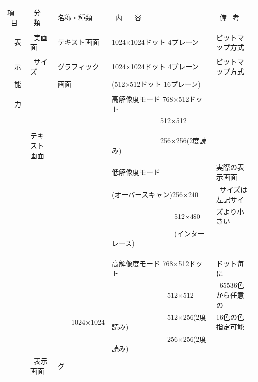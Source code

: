 \documentclass[twoside,a4paper,12pt]{article}
\begin{document}
\setlength{\tabcolsep}{0.5mm}
\begin{tabular}{|p{13mm}|p{23mm}|p{4mm}|p{20mm}|p{65mm}|p{36mm}|}
\hline
& & \multicolumn{2}{l|}{} & &\\[-2mm]
項 \ 目& \ 分 \ 類 & \multicolumn{2}{l|}{名称・種類} & \ 内 \ \ \ 容 & \ 備 \ 考\\[1mm]
\hline
& & \multicolumn{2}{l|}{} & &\\[-1mm]
\ \ 表 & \ 実画面 & \multicolumn{2}{l|}{テキスト画面} & 1024×1024ドット 4プレーン & ビットマップ方式\\
\cline{3-6}
& & \multicolumn{2}{l|}{} & &\\[-4mm]
\ \ 示 & \ サイズ & \multicolumn{2}{l|}{グラフィック} & 1024×1024ドット 4プレーン & ビットマップ方式\\
\ \ 能 & & \multicolumn{2}{l|}{画面} & (512×512ドット 16プレーン) &\\
\cline{2-6}
& & \multicolumn{2}{l|}{} & &\\[-4mm]
\ \ 力 & & \multicolumn{2}{l|}{} & 高解像度モード 768×512ドット &\\
& & \multicolumn{2}{l|}{} & \ \ \ \ \ \ \ \ \ \ \ \ \ \ 512×512 &\\
& & \multicolumn{2}{l|}{} & &\\
& テキスト画面 & \multicolumn{2}{l|}{} & \ \ \ \ \ \ \ \ \ \ \ \ \ \ 256×256(2度読み) &\\
& & \multicolumn{2}{l|}{} & 低解像度モード & 実際の表示画面\\
& & \multicolumn{2}{l|}{} & (オーバースキャン)256×240 & \ サイズは左記サイ\\
& & \multicolumn{2}{l|}{} & \ \ \ \ \ \ \ \ \ \ \ \ \ \ \ \ \ \ 512×480 & ズより小さい\\
& & \multicolumn{2}{l|}{} & \ \ \ \ \ \ \ \ \ \ \ \ \ \ \ \ \ \ (インターレース) &\\
& & \multicolumn{2}{l|}{} & &\\
& & \multicolumn{2}{l|}{} & &\\
\cline{2-6}
& & & & &\\[-4mm]
& & & & 高解像度モード 768×512ドット & ドット毎に\\
& & & & \ \ \ \ \ \ \ \ \ \ \ \ \ \ \ \ 512×512 & \ 65536色から任意の\\
& & & 1024×1024 & \ \ \ \ \ \ \ \ \ \ \ \ \ \ \ \ 512×256(2度読み) & 16色の色指定可能\\
& & & & \ \ \ \ \ \ \ \ \ \ \ \ \ \ \ \ 256×256(2度読み) &\\
& \ 表示画面 & グ & & &\\[2mm]

\end{tabular}
\end{document}
